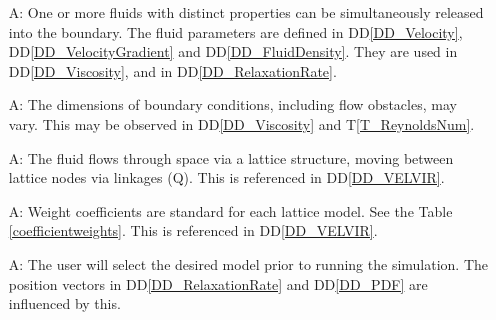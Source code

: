 \documentclass[12pt]{article}
\newcommand{\tref}[1]{T\ref{#1}}
\newcounter{assumpnum} %
\begin{document}
\begin{itemize}

\item[A\refstepcounter{assumpnum}\theassumpnum \label{A_fluids}:]
  One or more fluids with distinct properties can be simultaneously released into the boundary. The fluid parameters are defined in
  DD\ref{DD_Velocity}, DD\ref{DD_VelocityGradient} and DD\ref{DD_FluidDensity}. They are used in
  DD\ref{DD_Viscosity}, and in DD\ref{DD_RelaxationRate}.
  
\item[A\refstepcounter{assumpnum}\theassumpnum \label{A_flowObject}:]
  The dimensions of boundary conditions, including flow obstacles, may vary. This may be observed in DD\ref{DD_Viscosity} and \tref{T_ReynoldsNum}.
  
\item[A\refstepcounter{assumpnum}\theassumpnum \label{A_lattice}:]
  The fluid flows through space via a lattice structure, moving between lattice
  nodes via linkages ($\mathrm{Q}$). This is referenced in DD\ref{DD_VELVIR}.

  
\item[A\refstepcounter{assumpnum}\theassumpnum \label{A_weightCoefficients}:]
  Weight coefficients are standard for each lattice model. See the Table
  \ref{coefficientweights}. This is referenced in DD\ref{DD_VELVIR}.

\item[A\refstepcounter{assumpnum}\theassumpnum \label{A_selectModel}:] The user
  will select the desired model prior to running the simulation. The position
  vectors in DD\ref{DD_RelaxationRate} and DD\ref{DD_PDF} are influenced by this.

\end{itemize}
\end{document}
